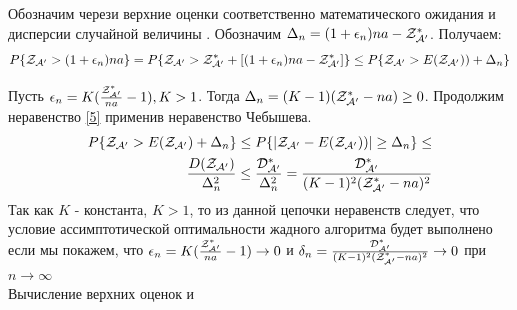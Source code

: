 \documentclass[a4paper, 14pt]{extarticle}
\begin{document}
Обозначим через\topboundE и \topboundD верхние оценки соответственно математического ожидания \randomvalueE и дисперсии \randomvalueD случайной величины \randomvalue . Обозначим $\Delta_n=(1+\epsilon_n)na-\text{$\mathcal{Z^*_{A'}}$}$. Получаем:
\begin{equation}\label{5}
P\{\text{$\mathcal{Z_{A'}}$} > (1+\epsilon_n)na\} = 
P\{\text{$\mathcal{Z_{A'}}$} > \text{$\mathcal{Z^*_{A'}}$}+[(1+\epsilon_n)na-\text{$\mathcal{Z^*_{A'}}$}]\} \leq
P\{\text{$\mathcal{Z_{A'}}$} > \text{$E(\text{$\mathcal{Z_{A'}}$})$})+ \Delta_n\}
\end{equation}

Пусть $\epsilon_n = K(\frac{\text{$\mathcal{Z^*_{A'}}$}}{na}-1), K>1$.
Тогда $ \Delta_n = (K-1)(\text{$\mathcal{Z^*_{A'}}$}-na) \geq 0$.
Продолжим неравенство \eqref{5} применив неравенство Чебышева.
\begin{equation}\label{6}
\begin{aligned}
P\{\text{$\mathcal{Z_{A'}}$}> E(\text{$\mathcal{Z_{A'}}$})+ \Delta_n\} \leq 
P\{|\text{$\mathcal{Z_{A'}}$}- \text{$E(\text{$\mathcal{Z_{A'}}$})$})| \geq \Delta_n\} \leq \\
\frac{\text{$D(\text{$\mathcal{Z_{A'}}$})$}}{\Delta^2_n} \leq
\frac{\text{$\mathcal{D^*_{A'}}$}}{\Delta^2_n} = 
\frac{\text{$\mathcal{D^*_{A'}}$}}{(K-1)^2(\text{$\mathcal{Z^*_{A'}}$}-na)^2}
\end{aligned}
\end{equation}
Так как $K$ - константа, $K>1$, то из данной цепочки неравенств следует, что условие ассимптотической оптимальности жадного алгоритма будет выполнено если мы покажем, что
$ \epsilon_n=K(\frac{\text{$\mathcal{Z^*_{A'}}$}}{na}-1) \rightarrow 0$ и 
$ \delta_n = \frac{\text{$\mathcal{D^*_{A'}}$}}{(K-1)^2(\text{$\mathcal{Z^*_{A'}}$}-na)^2} \rightarrow 0$ при $ n \rightarrow \infty$\\

Вычисление верхних оценок \topboundE и \topboundD\\

\newcommand{\chanceLklesserX}{$\Phi_k(x)$}
\newcommand{\randomNormalValueE}{$l_k$}
\end{document}
